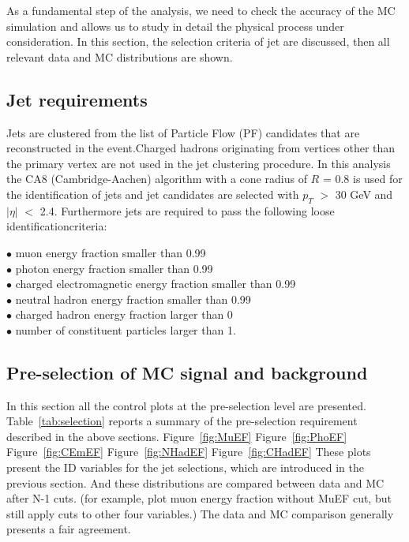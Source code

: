 \documentclass[12pt]{article} %
\begin{document}
As a fundamental step of the analysis, we need to check the accuracy of the MC simulation and allows us to study in detail the physical process under consideration. In this section, the selection criteria of jet are discussed, then all relevant data and MC distributions are shown.


\subsection{Jet requirements} %

Jets are clustered from the list of Particle Flow (PF) candidates that are reconstructed in the event.Charged hadrons originating from vertices other than the primary vertex are not used in the jet clustering procedure. In this analysis the CA8 (Cambridge-Aachen) algorithm with a cone radius of $R$ = 0.8 is used for the identification of jets and jet candidates are selected with $p_T$ $>$ 30 GeV and $\left|\eta\right|$ $<$ 2.4. Furthermore jets are required to pass the following loose identificationcriteria:


\noindent
$\bullet$ muon energy fraction smaller than 0.99 \\
$\bullet$ photon energy fraction smaller than 0.99 \\
$\bullet$ charged electromagnetic energy fraction smaller than 0.99 \\
$\bullet$ neutral hadron energy fraction smaller than 0.99 \\
$\bullet$ charged hadron energy fraction larger than 0 \\
$\bullet$ number of constituent particles larger than 1. 


\subsection{Pre-selection of MC signal and background} %

In this section all the control plots at the pre-selection level are presented. Table~\ref{tab:selection} reports a summary of the pre-selection requirement described in the above sections. Figure~\ref{fig:MuEF} Figure~\ref{fig:PhoEF} Figure~\ref{fig:CEmEF} Figure~\ref{fig:NHadEF} Figure~\ref{fig:CHadEF} These plots present the ID variables for the jet selections, which are introduced in the previous section. And these distributions are compared between data and MC after N-1 cuts. (for example, plot muon energy fraction without MuEF cut, but still apply cuts to other four variables.) The data and MC comparison generally presents a fair agreement. 
\end{document}
